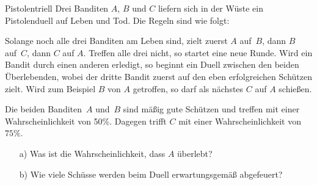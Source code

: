 \documentclass{uebungszettel}
\begin{document}
\begin{aufgabe}{Pistolentriell}
  Drei Banditen $A$, $B$ und $C$ liefern sich in der Wüste ein Pistolenduell auf Leben und Tod.
  Die Regeln sind wie folgt:

  \begin{addmargin}{1cm}
    Solange noch alle drei Banditen am Leben sind, zielt zuerst $A$ auf~$B$, dann $B$ auf~$C$, dann $C$ auf $A$.
    Treffen alle drei nicht, so startet eine neue Runde.
    Wird ein Bandit durch einen anderen erledigt, so beginnt ein Duell zwischen den beiden Überlebenden, wobei der dritte Bandit zuerst auf den eben erfolgreichen Schützen zielt.
    Wird zum Beispiel $B$ von $A$ getroffen, so darf als nächstes $C$ auf $A$ schießen.
  \end{addmargin}

  Die beiden Banditen~$A$ und~$B$ sind mäßig gute Schützen und treffen mit einer Wahrscheinlichkeit von 50\%.
  Dagegen trifft $C$ mit einer Wahrscheinlichkeit von~$75\%$.
  \begin{enumerate}
    \item[a)] Was ist die Wahrscheinlichkeit, dass $A$ überlebt?
    \item[b)] Wie viele Schüsse werden beim Duell erwartungsgemäß abgefeuert?
  \end{enumerate}

  \vspace{1cm}
  \begin{center}
  \end{center}
\end{aufgabe}
\end{document}
